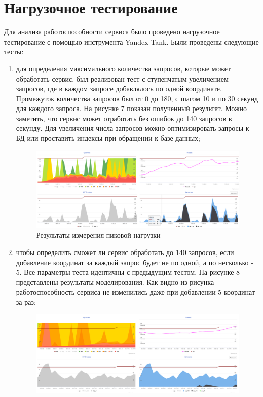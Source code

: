 \documentclass[a4paper, 10pt]{article}
\begin{document}
	\section{Нагрузочное тестирование}
	\hspace*{5mm} Для анализа работоспособности сервиса было проведено нагрузочное тестирование с помощью инструмента Yandex-Tank. Были проведены следующие тесты:
	\begin{enumerate}
		\item для определения максимального количества запросов, которые может обработать сервис, был реализован тест с ступенчатым увеличением запросов, где в каждом запросе добавлялось по одной координате. Промежуток количества запросов был от 0 до 180, с шагом 10 и по 30 секунд для каждого запроса. На рисунке 7 показан полученный результат. Можно заметить, что сервис может отработать без ошибок до 140 запросов в секунду. Для увеличения числа запросов можно оптимизировать запросы к БД или проставить индексы при обращении к базе данных;
		\begin{figure}[h!]
			\centering
			\includegraphics[scale=0.4]{max}
			\centering\caption{Результаты измерения пиковой нагрузки}
		\end{figure}
		\item чтобы определить сможет ли сервис обработать до 140 запросов, если добавление координат за каждый запрос будет не по одной, а по несколько - 5. Все параметры теста идентичны с предыдущим тестом. На рисунке 8 представлены результаты моделирования. Как видно из рисунка работоспособность сервиса не изменились даже при добавлении 5 координат за раз;
		\begin{figure}[h!]
			\centering
			\includegraphics[scale=0.4]{5}

\end{figure}
\end{enumerate}
\end{document}
